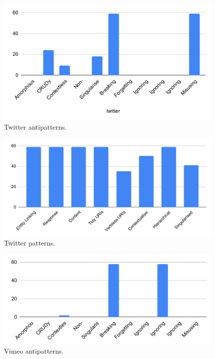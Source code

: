 \documentclass[a4paper,12pt]{article}
\begin{document}
\begin{figure}[!h]
\begin{center}
\includegraphics[keepaspectratio,scale=0.8]{Template_report_LaTeX_EN/img/barchart/twitterBarAnti.pdf}
\caption{Twitter antipatterns.}
\label{fig:twitterBarAnti}
\end{center}
\end{figure}

\begin{figure}[!h]
\begin{center}
\includegraphics[keepaspectratio,scale=0.8]{Template_report_LaTeX_EN/img/barchart/twitterBarPatt.pdf}
\caption{Twitter patterns.}
\label{fig:twitterBarPatt}
\end{center}
\end{figure}

\begin{figure}[!h]
\begin{center}
\includegraphics[keepaspectratio,scale=0.8]{Template_report_LaTeX_EN/img/barchart/vimeoBarAnti.pdf}
\caption{Vimeo antipatterns.}
\label{fig:vimeoBarAnti}
\end{center}
\end{figure}
\end{document}
